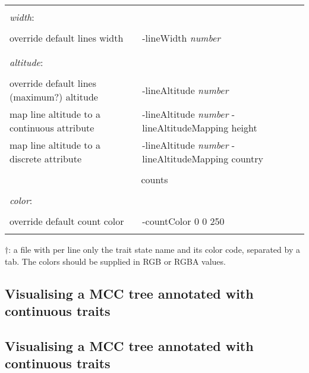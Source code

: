 \documentclass[english]{paper}
\begin{document}
\begin{table}[!ht]
\begin{tabular}{ll}
								&						\\
\textit{width}:					&						\\
								&						\\
	override default lines width		&-lineWidth \textit{number}	\\
								&						\\
								&						\\
\textit{altitude}:				&						\\
								&						\\
override default lines (maximum?) altitude	&-lineAltitude  \textit{number}	\\
map line altitude to a continuous attribute	&-lineAltitude  \textit{number} -lineAltitudeMapping height	\\
map line altitude to a discrete attribute	&-lineAltitude  \textit{number} -lineAltitudeMapping country\\
								&						\\
\midrule
			\multicolumn{2}{c}{counts}				\\
\midrule
								&						\\
\textit{color}:					&						\\
								&						\\
override default count color			&	-countColor 0 0 250		\\
								&						\\
\bottomrule
\end{tabular}
\begin{flushleft}
{\footnotesize 
$\dagger$: a file with per line only the trait state name and its color code, separated by a tab. The colors should be supplied in RGB or RGBA values.
} 
\end{flushleft}
\label{tab:options}
 \end{table}


\subsection{Visualising a MCC tree annotated with continuous traits}
% 

\subsection{Visualising a MCC tree annotated with continuous traits}
\label{JSONmerge}
\end{document}
